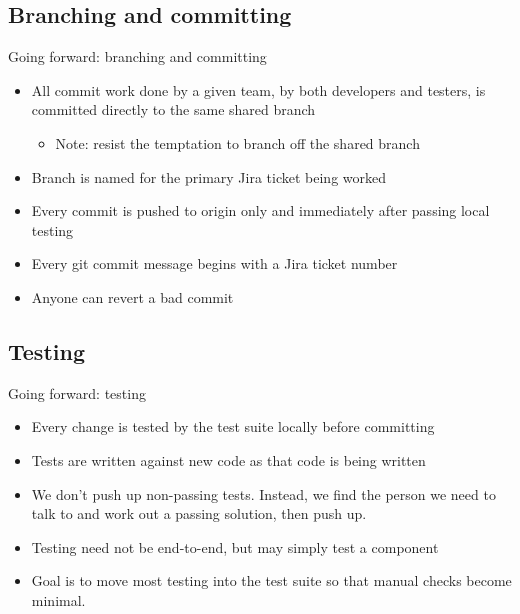\documentclass{beamer}
\begin{document}
	\subsection{Branching and committing}
	\begin{frame}{Going forward: branching and committing}
		\begin{itemize}
			\item All commit work done by a given team, by both developers and testers, is committed directly to the same shared branch \pause
			\begin{itemize}
				\item Note: resist the temptation to branch off the shared branch \pause
			\end{itemize}
			\item Branch is named for the primary Jira ticket being worked \pause
			\item Every commit is pushed to origin only and immediately after passing local testing \pause
			\item Every git commit message begins with a Jira ticket number \pause
			\item Anyone can revert a bad commit \pause
		\end{itemize}
	\end{frame}
	\subsection{Testing}
	\begin{frame}{Going forward: testing}
		\begin{itemize}
			\item Every change is tested by the test suite locally before committing \pause
			\item Tests are written against new code as that code is being written  \pause
			\item We don't push up non-passing tests. Instead, we find the person we need to talk to and work out a passing solution, then push up. \pause
			\item Testing need not be end-to-end, but may simply test a component \pause
			\item Goal is to move most testing into the test suite so that manual checks become minimal. \pause
		\end{itemize}
	\end{frame}
\end{document}
